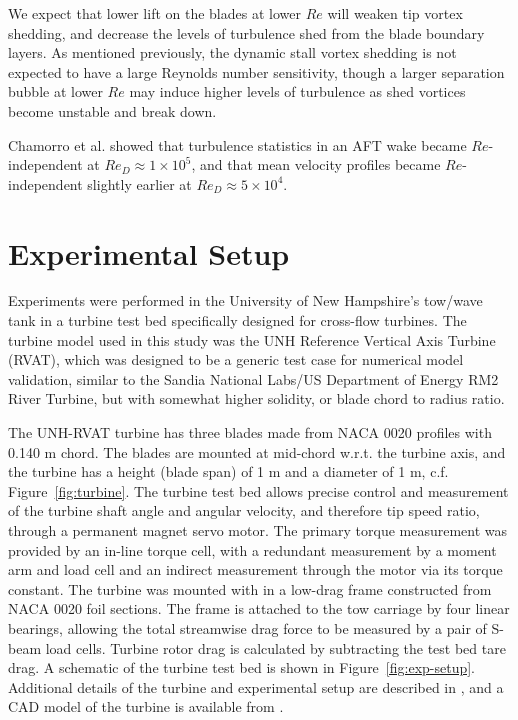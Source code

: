 \documentclass[energies,article,accept,moreauthors,pdftex,12pt,a4paper]{mdpi}
\begin{document}
We expect that lower lift on the blades at lower $Re$ will weaken tip vortex
shedding, and decrease the levels of turbulence shed from the blade boundary
layers. As mentioned previously, the dynamic stall vortex shedding is not
expected to have a large Reynolds number sensitivity, though a larger separation
bubble at lower $Re$ may induce higher levels of turbulence as shed vortices
become unstable and break down.


Chamorro et al. \cite{Chamorro2012} showed that turbulence statistics in an AFT 
wake became
$Re$-independent at $Re_D \approx 1 \times 10^5$, and that mean velocity 
profiles became $Re$-independent slightly earlier at $Re_D \approx 5 \times 
10^4$.
\section{Experimental Setup}

Experiments were performed in the University of New Hampshire's tow/wave tank
in a turbine test bed specifically designed for cross-flow turbines. The 
turbine model used in this study was the UNH Reference Vertical Axis Turbine 
(RVAT), which was designed to be a generic test case for numerical
model validation, similar to the Sandia National Labs/US Department of Energy 
RM2
River Turbine, but with somewhat higher solidity, or blade chord to radius 
ratio. 


The UNH-RVAT turbine has three blades made from NACA 0020 profiles with 
0.140 m chord. The blades are mounted at mid-chord w.r.t. the turbine axis, and 
the turbine has a height (blade span) of 1 m and a diameter of 1 m, c.f. 
Figure~\ref{fig:turbine}. The turbine test bed allows precise control and 
measurement of the turbine shaft angle and angular velocity, and therefore tip 
speed ratio, through a permanent magnet servo motor.
The primary torque measurement was provided by an in-line torque cell, with a 
redundant measurement by a moment arm and load cell and an indirect measurement 
through the motor via its torque constant.
The turbine was mounted with in a low-drag frame constructed from NACA 0020 
foil sections.  The frame is attached to the tow carriage by four linear 
bearings, allowing the total streamwise drag force to be measured by a pair of 
S-beam load cells. Turbine rotor drag is calculated by subtracting the test bed 
tare drag.
A schematic of the turbine test bed is shown in 
Figure~\ref{fig:exp-setup}.
Additional details of the turbine and experimental setup are described in
\cite{Bachant2015-JoT}, and a CAD model of the turbine is available from
\cite{Bachant2014-RVAT-CAD}.
\end{document}
